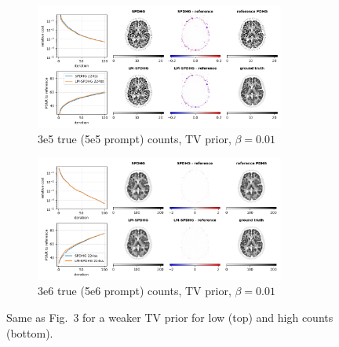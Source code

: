 \documentclass[10pt,twocolumn,twoside]{article}
\begin{document}
\renewcommand{\figurename}{Supplementary Figure}

\begin{figure}
  \centering
  \begin{subfigure}[]{1.0\textwidth}
    \centering
    \includegraphics[width=0.9\textwidth]{./figs/brain2d_counts_3.0E+05_seed_1_beta_1.0E-02_prior_TV_niter_ref_20000_fwhm_4.5_4.5_niter_100.png}
    \caption{3e5 true (5e5 prompt) counts, TV prior, $\beta = 0.01$}
  \end{subfigure}
  \vfill
  \begin{subfigure}[]{1.0\textwidth}
    \centering
    \includegraphics[width=0.9\textwidth]{./figs/brain2d_counts_3.0E+06_seed_1_beta_1.0E-02_prior_TV_niter_ref_20000_fwhm_4.5_4.5_niter_100.png}
    \caption{3e6 true (5e6 prompt) counts, TV prior, $\beta = 0.01$}
  \end{subfigure}
  \caption{Same as Fig.~3 for a weaker TV prior for low (top) and high counts (bottom).}
\end{figure}
\end{document}
